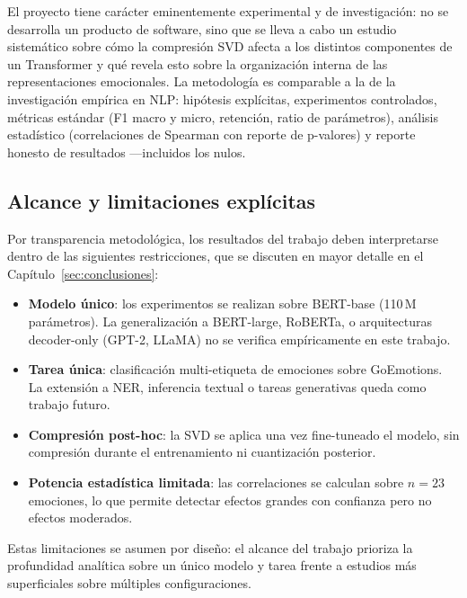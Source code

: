 El proyecto tiene carácter eminentemente experimental y de investigación: no
se desarrolla un producto de software, sino que se lleva a cabo un estudio
sistemático sobre cómo la compresión SVD afecta a los distintos componentes de
un Transformer y qué revela esto sobre la organización interna de las
representaciones emocionales. La metodología es comparable a la de la
investigación empírica en NLP: hipótesis explícitas, experimentos controlados,
métricas estándar (F1 macro y micro, retención, ratio de parámetros), análisis
estadístico (correlaciones de Spearman con reporte de p-valores) y reporte
honesto de resultados ---incluidos los nulos.


\subsection{Alcance y limitaciones explícitas}
\label{sec:alcance-limitaciones}

Por transparencia metodológica, los resultados del trabajo deben interpretarse
dentro de las siguientes restricciones, que se discuten en mayor detalle en el
Capítulo~\ref{sec:conclusiones}:

\begin{itemize}[nosep]
    \item \textbf{Modelo único}: los experimentos se realizan sobre BERT-base
    (110\,M parámetros). La generalización a BERT-large, RoBERTa, o
    arquitecturas decoder-only (GPT-2, LLaMA) no se verifica empíricamente
    en este trabajo.

    \item \textbf{Tarea única}: clasificación multi-etiqueta de emociones
    sobre GoEmotions. La extensión a NER, inferencia textual o tareas
    generativas queda como trabajo futuro.

    \item \textbf{Compresión post-hoc}: la SVD se aplica una vez fine-tuneado
    el modelo, sin compresión durante el entrenamiento ni cuantización
    posterior.

    \item \textbf{Potencia estadística limitada}: las correlaciones se
    calculan sobre $n = 23$ emociones, lo que permite detectar efectos
    grandes con confianza pero no efectos moderados.
\end{itemize}

Estas limitaciones se asumen por diseño: el alcance del trabajo prioriza la
profundidad analítica sobre un único modelo y tarea frente a estudios más
superficiales sobre múltiples configuraciones.


